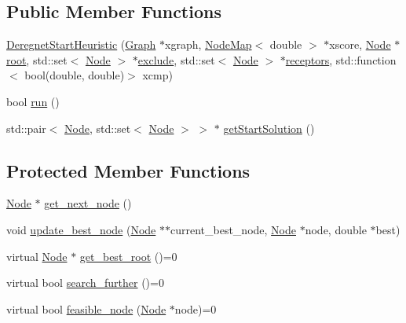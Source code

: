 \subsection*{Public Member Functions}
\begin{DoxyCompactItemize}
\item 
\hyperlink{classderegnet_1_1DeregnetStartHeuristic_af7fa694b10f54c669fce9431214ffc98}{Deregnet\+Start\+Heuristic} (\hyperlink{namespacederegnet_a55b76c55bbabc682cbc61f8b9948799e}{Graph} $\ast$xgraph, \hyperlink{namespacederegnet_ae102b707ae1d6f83c639ece5e0dd5658}{Node\+Map}$<$ double $>$ $\ast$xscore, \hyperlink{namespacederegnet_a744bad34f2de9856d36715a445f027f3}{Node} $\ast$\hyperlink{classderegnet_1_1DeregnetStartHeuristic_a4605d41352e3adf1f9f9f32466a4e61e}{root}, std\+::set$<$ \hyperlink{namespacederegnet_a744bad34f2de9856d36715a445f027f3}{Node} $>$ $\ast$\hyperlink{classderegnet_1_1DeregnetStartHeuristic_aa22c6581cd404bf7ac325850b28dc951}{exclude}, std\+::set$<$ \hyperlink{namespacederegnet_a744bad34f2de9856d36715a445f027f3}{Node} $>$ $\ast$\hyperlink{classderegnet_1_1DeregnetStartHeuristic_ab80c046ff2b7c64086fceb84987b3e50}{receptors}, std\+::function$<$ bool(double, double)$>$ xcmp)
\item 
bool \hyperlink{classderegnet_1_1DeregnetStartHeuristic_aa2afcafa3d3838a7e7b05faf586954e8}{run} ()
\item 
std\+::pair$<$ \hyperlink{namespacederegnet_a744bad34f2de9856d36715a445f027f3}{Node}, std\+::set$<$ \hyperlink{namespacederegnet_a744bad34f2de9856d36715a445f027f3}{Node} $>$ $>$ $\ast$ \hyperlink{classderegnet_1_1DeregnetStartHeuristic_aacc20eaced32a65e78fcc18e56f966cc}{get\+Start\+Solution} ()
\end{DoxyCompactItemize}
\subsection*{Protected Member Functions}
\begin{DoxyCompactItemize}
\item 
\hyperlink{namespacederegnet_a744bad34f2de9856d36715a445f027f3}{Node} $\ast$ \hyperlink{classderegnet_1_1DeregnetStartHeuristic_a6ec478444151e54625951f858ff76761}{get\+\_\+next\+\_\+node} ()
\item 
void \hyperlink{classderegnet_1_1DeregnetStartHeuristic_a50179ff9db4d416b93ff41d1dcee1358}{update\+\_\+best\+\_\+node} (\hyperlink{namespacederegnet_a744bad34f2de9856d36715a445f027f3}{Node} $\ast$$\ast$current\+\_\+best\+\_\+node, \hyperlink{namespacederegnet_a744bad34f2de9856d36715a445f027f3}{Node} $\ast$node, double $\ast$best)
\item 
virtual \hyperlink{namespacederegnet_a744bad34f2de9856d36715a445f027f3}{Node} $\ast$ \hyperlink{classderegnet_1_1DeregnetStartHeuristic_a372be86d0fb8ac94bd926a1f4d09e102}{get\+\_\+best\+\_\+root} ()=0
\item 
virtual bool \hyperlink{classderegnet_1_1DeregnetStartHeuristic_ac3ee2c3022512f9d4ec7a6b49358e60a}{search\+\_\+further} ()=0
\item 
virtual bool \hyperlink{classderegnet_1_1DeregnetStartHeuristic_ac296c4f122f7d3ad2fcc2cbb0d1b5379}{feasible\+\_\+node} (\hyperlink{namespacederegnet_a744bad34f2de9856d36715a445f027f3}{Node} $\ast$node)=0
\end{DoxyCompactItemize}
